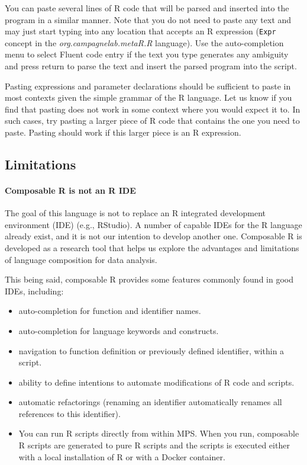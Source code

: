 You can paste several lines of R code that will be parsed and inserted into the program in a similar manner. Note that you do not need to paste any text and may just start typing into any location that accepts an R expression (\texttt{Expr} concept in the \textit{org\allowbreak{}.campagnelab\allowbreak{}.metaR\allowbreak{}.R} language). Use the auto-completion menu to select Fluent code entry if the text you type generates any ambiguity and press return to parse the text and insert the parsed program into the script. 

\begin{remark}
Pasting expressions and parameter declarations should be sufficient to paste in most contexts given the simple grammar of the R language. Let us know if you find that pasting does not work in some context where you would expect it to. In such cases, try pasting a larger piece of R code that contains the one you need to paste. Pasting should work if this larger piece is an R expression. 
\end{remark}


\subsection{Limitations}

\paragraph{Composable R is not an R IDE}

The goal of this language is not to replace an R integrated development environment (IDE) (e.g., RStudio). A number of capable IDEs for the R language already exist, and it is not our intention to develop another one.  Composable R is developed as a research tool that helps us explore the advantages and limitations of language composition for data analysis.

This being said, composable R  provides some features commonly found in good IDEs, including:
\begin{itemize}
  \item auto-completion for function and identifier names.
  \item auto-completion for language keywords and constructs.
  \item navigation to function definition or previously defined identifier, within a script.
  \item ability to define intentions to automate modifications of R code and scripts.
  \item automatic refactorings (renaming an identifier automatically renames all references to this identifier).
  \item You can run R scripts directly from within MPS. When you run, composable R scripts are generated to pure R scripts and the scripts is executed either with a local installation of R or with a Docker container. 
\end{itemize}



